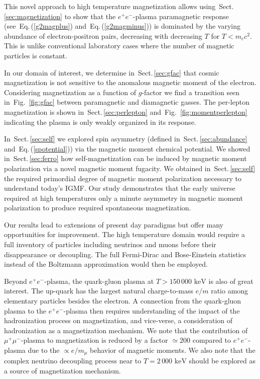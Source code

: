 \documentclass[aps,prd,floatfix,reprint]{revtex4-2}
\newcommand*{\keV}{\text{ keV}}
\newcommand{\req}[1]{Eq.\,(\ref{#1})}
\newcommand{\rf}[1]{Fig.~{\ref{#1}}}
\newcommand{\rsec}[1]{Sect.\,{\ref{#1}}}
\begin{document}
This novel approach to high temperature magnetization allows using~\rsec{sec:magnetization} to show that the $e^{+}e^{-}$-plasma paramagnetic response (see~\req{g2magplus} and~\req{g2magminus}) is dominated by the varying abundance of electron-positron pairs, decreasing with decreasing $T$ for $T<m_{e}c^2$. This is unlike conventional laboratory cases where the number of magnetic particles is constant. 

In our domain of interest, we determine in~\rsec{sec:gfac} that cosmic magnetization is not sensitive to the anomalous magnetic moment of the electron. Considering magnetization as a function of $g$-factor we find a transition seen in~\rf{fig:gfac} between paramagnetic and diamagnetic gasses. The per-lepton magnetization is shown in~\rsec{sec:perlepton} and~\rf{fig:momentperlepton} indicating the plasma is only weakly organized in its response.

In~\rsec{sec:self} we explored spin asymmetry (defined in~\rsec{sec:abundance} and~\req{spotential}) via the magnetic moment  chemical potential. We showed in~\rsec{sec:ferro} how self-magnetization can be induced by magnetic moment polarization via a novel magnetic moment fugacity. We obtained in~\rsec{sec:self} the required primordial degree of magnetic moment polarization necessary to understand today's IGMF. Our study demonstrates that the early universe required at high temperatures only a minute asymmetry in magnetic moment polarization to produce required spontaneous magnetization.

Our results lead to extensions of present day paradigms but offer many opportunities for improvement. The high temperature domain would require a full inventory of particles including neutrinos and muons before their disappearance or decoupling. The full Fermi-Dirac and Bose-Einstein statistics instead of the Boltzmann approximation would then be employed. 

Beyond $e^{+}e^{-}$-plasma, the quark-gluon plasma at $T>150\,000\keV$ is also of great interest. The up-quark has the largest natural charge-to-mass $e/m$ ratio among elementary particles besides the electron. A connection from the quark-gluon plasma to the $e^{+}e^{-}$-plasma then requires understanding of the impact of the hadronization process on magnetization, and vice-verse, a consideration of hadronization as a magnetization mechanism. We note that the contribution of $\mu^{+}\mu^{-}$-plasma to magnetization is reduced by a factor $\simeq 200$ compared to $e^{+}e^{-}$-plasma due to the $\propto e/m_{\mu}$ behavior of magnetic moments. We also note that the complex neutrino decoupling process near to $T=2\,000\keV$ should be explored as a source of magnetization mechanism.
 
\end{document}
